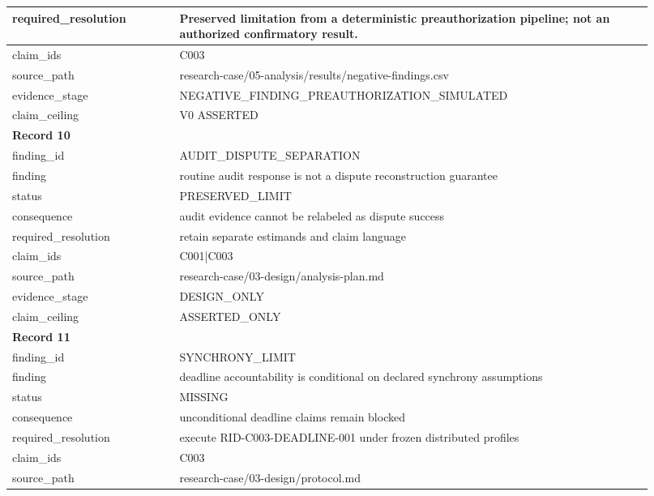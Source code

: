 \begin{longtable}{|p{0.24\linewidth}|p{0.68\linewidth}|}
required\_\allowbreak{}resolution & Preserved limitation from a deterministic preauthorization pipeline;\allowbreak{} not an authorized confirmatory result. \\ \hline
claim\_\allowbreak{}ids & C003 \\ \hline
source\_\allowbreak{}path & research-case/05-analysis/results/negative-findings.csv \\ \hline
evidence\_\allowbreak{}stage & NEGATIVE\_\allowbreak{}FINDING\_\allowbreak{}PREAUTHORIZATION\_\allowbreak{}SIMULATED \\ \hline
claim\_\allowbreak{}ceiling & V0 ASSERTED \\ \hline
\multicolumn{2}{|l|}{\textbf{Record 10}} \\ \hline
finding\_\allowbreak{}id & AUDIT\_\allowbreak{}DISPUTE\_\allowbreak{}SEPARATION \\ \hline
finding & routine audit response is not a dispute reconstruction guarantee \\ \hline
status & PRESERVED\_\allowbreak{}LIMIT \\ \hline
consequence & audit evidence cannot be relabeled as dispute success \\ \hline
required\_\allowbreak{}resolution & retain separate estimands and claim language \\ \hline
claim\_\allowbreak{}ids & C001|C003 \\ \hline
source\_\allowbreak{}path & research-case/03-design/analysis-plan.md \\ \hline
evidence\_\allowbreak{}stage & DESIGN\_\allowbreak{}ONLY \\ \hline
claim\_\allowbreak{}ceiling & ASSERTED\_\allowbreak{}ONLY \\ \hline
\multicolumn{2}{|l|}{\textbf{Record 11}} \\ \hline
finding\_\allowbreak{}id & SYNCHRONY\_\allowbreak{}LIMIT \\ \hline
finding & deadline accountability is conditional on declared synchrony assumptions \\ \hline
status & MISSING \\ \hline
consequence & unconditional deadline claims remain blocked \\ \hline
required\_\allowbreak{}resolution & execute RID-C003-DEADLINE-001 under frozen distributed profiles \\ \hline
claim\_\allowbreak{}ids & C003 \\ \hline
source\_\allowbreak{}path & research-case/03-design/protocol.md \\ \hline

\end{longtable}

